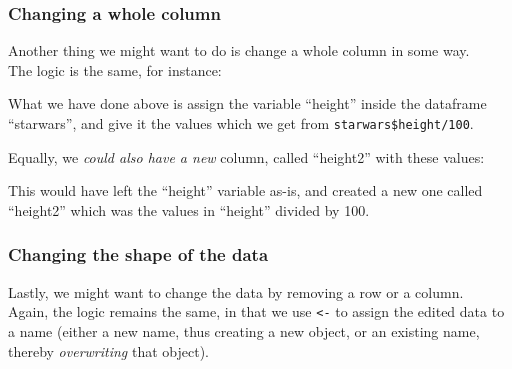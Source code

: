 \documentclass[]{book}
\newenvironment{Shaded}{\begin{snugshade}}{\end{snugshade}}
\newcommand{\DecValTok}[1]{\textcolor[rgb]{0.00,0.00,0.81}{#1}}
\newcommand{\NormalTok}[1]{#1}
\newcommand{\OperatorTok}[1]{\textcolor[rgb]{0.81,0.36,0.00}{\textbf{#1}}}
\newcommand{\StringTok}[1]{\textcolor[rgb]{0.31,0.60,0.02}{#1}}
\begin{document}
\hypertarget{changing-a-whole-column}{%
\subsubsection*{Changing a whole column}\label{changing-a-whole-column}}

Another thing we might want to do is change a whole column in some way.\\
The logic is the same, for instance:

\begin{Shaded}
\end{Shaded}

What we have done above is assign the variable ``height'' inside the dataframe ``starwars'', and give it the values which we get from \texttt{starwars\$height/100}.

Equally, we \emph{could also have a new} column, called ``height2'' with these values:

\begin{Shaded}
\end{Shaded}

This would have left the ``height'' variable as-is, and created a new one called ``height2'' which was the values in ``height'' divided by 100.

\hypertarget{changing-the-shape-of-the-data}{%
\subsubsection*{Changing the shape of the data}\label{changing-the-shape-of-the-data}}

Lastly, we might want to change the data by removing a row or a column.\\
Again, the logic remains the same, in that we use \texttt{\textless{}-} to assign the edited data to a name (either a new name, thus creating a new object, or an existing name, thereby \emph{overwriting} that object).
\end{document}
